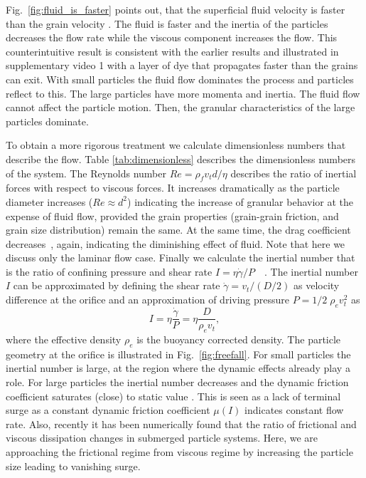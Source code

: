 \documentclass[twoside,twocolumn,9pt]{article}
\begin{document}
Fig.~\ref{fig:fluid_is_faster} points out, that the superficial fluid velocity is faster than the grain velocity \cite{koivistoSubmitted}.
The fluid is faster and the inertia of the particles decreases the flow rate while the viscous component increases the flow.
This counterintuitive result is consistent with the earlier results 
\cite{koivistoSubmitted} and illustrated in supplementary video 1 with a 
layer of dye that propagates faster than the grains can exit. 
With small particles the fluid flow dominates the process and particles reflect to this.
The large particles have more momenta and inertia.
The fluid flow cannot affect the particle motion. Then, 
the granular characteristics of the large particles dominate.

To obtain a more rigorous treatment we calculate dimensionless numbers that describe the flow.
Table \ref{tab:dimensionless} describes the dimensionless numbers of the system.
The Reynolds number $Re = \rho_f v_t d/\eta$ describes the ratio of inertial forces with respect to viscous forces. 
It increases dramatically as the particle diameter increases ($Re \approx d^2$) indicating
the increase of granular behavior at the expense of fluid flow, provided the grain properties (grain-grain friction, and grain size distribution) remain the same.
At the same time, the drag coefficient decreases~\cite{Morrison2013Drag}, again, indicating 
the diminishing effect of fluid. Note that here we discuss only the laminar flow case.
Finally we calculate the inertial number that is the ratio of confining 
pressure and shear rate $I=\eta \dot{\gamma}/P$~~\cite{Houssais15NCO, Kamrin15SM}. 
The inertial number $I$ can be approximated by defining the shear rate 
$\dot{\gamma} = v_t/(D/2)$ as velocity difference at the orifice and an 
approximation of driving pressure $P = 1/2\;\rho_{e} v_t^2$
as
%
\begin{equation}
 I 	= \eta \frac{\dot{\gamma}}{P} = \eta \frac{D}{\rho_{e}v_t}, 
\end{equation}
%
\noindent where the effective density $\rho_{e}$ is the buoyancy 
corrected density. 
The particle geometry at the orifice is illustrated in Fig.~\ref{fig:freefall}.
For small particles the inertial number is large, at the region where the 
dynamic effects already play a role. For large particles 
the inertial number decreases and the dynamic friction coefficient 
saturates (close) to static value \cite{Singh15NJP}.
This is seen as a lack of terminal surge as a constant dynamic friction
coefficient $\mu(I)$ indicates constant flow rate. 
Also, recently \cite{Trulsson16PRE} it has been numerically found that the ratio of frictional and viscous dissipation changes in submerged particle systems. Here, we are approaching the frictional regime from viscous regime by increasing the particle size leading to vanishing surge. 
\end{document}
